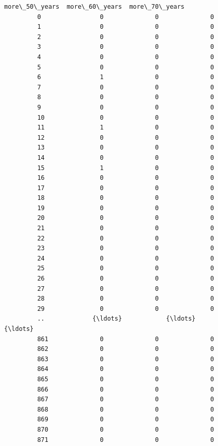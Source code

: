 \documentclass[11pt]{article}
\begin{document}
\begin{Verbatim}[commandchars=\\\{\}]
              more\_50\_years  more\_60\_years  more\_70\_years  
         0                0              0              0  
         1                0              0              0  
         2                0              0              0  
         3                0              0              0  
         4                0              0              0  
         5                0              0              0  
         6                1              0              0  
         7                0              0              0  
         8                0              0              0  
         9                0              0              0  
         10               0              0              0  
         11               1              0              0  
         12               0              0              0  
         13               0              0              0  
         14               0              0              0  
         15               1              0              0  
         16               0              0              0  
         17               0              0              0  
         18               0              0              0  
         19               0              0              0  
         20               0              0              0  
         21               0              0              0  
         22               0              0              0  
         23               0              0              0  
         24               0              0              0  
         25               0              0              0  
         26               0              0              0  
         27               0              0              0  
         28               0              0              0  
         29               0              0              0  
         ..             {\ldots}            {\ldots}            {\ldots}  
         861              0              0              0  
         862              0              0              0  
         863              0              0              0  
         864              0              0              0  
         865              0              0              0  
         866              0              0              0  
         867              0              0              0  
         868              0              0              0  
         869              0              0              0  
         870              0              0              0  
         871              0              0              0  

\end{Verbatim}
\end{document}
